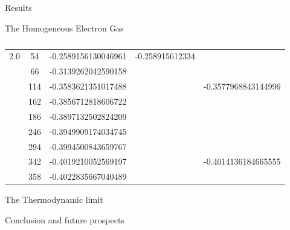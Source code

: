 \documentclass[twoside,english]{uiofysmaster}
\begin{document}
\begin{chapter}{Results}
\begin{section}{The Homogeneous Electron Gas}
\begin{table}[H]
\begin{center}
\begin{tabular}[center]{l  c  c  c r}
					\hline
					2.0 &  54 & -0.2589156130046961 & -0.258915612334 &   \\
						&  66 & -0.3139262042590158 &  & \\
						& 114 & -0.3583621351017488 &  &  -0.3577968843144996 \\
						& 162 & -0.3856712818606722 &  & \\
						& 186 & -0.3897132502824209 &  & \\
						& 246 & -0.3949909174034745 &  & \\
						& 294 & -0.3994500843659767 &  & \\
						& 342 & -0.4019210052569197 &  &  -0.4014136184665555 \\
						& 358 & -0.4022835667040489 &  & \\
				\end{tabular}
			\end{center}
			\caption{ }
			\label{table:CompareAudun}
		\end{table}

		\begin{subsection}{The Thermodynamic limit}
			
		\end{subsection}

	\end{section}

\end{chapter}



\begin{chapter}{Conclusion and future prospects}
	
\end{chapter}


\medskip
\end{document}
